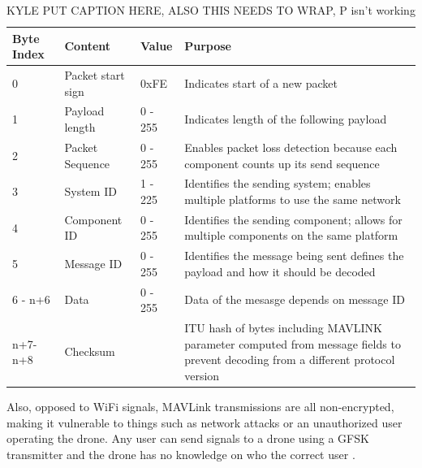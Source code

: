 \begin{table}[ht]
\centering
\caption{KYLE PUT CAPTION HERE, ALSO THIS NEEDS TO WRAP, P isn't working}
\begin{tabular}{|l|l|l|l|} %
  \hline
  Byte Index & Content & Value &  Purpose \\ \hline
          0 &	Packet start sign &                  0xFE &       Indicates start of a new packet\\
          1 &   Payload length &                0 - 255 &       Indicates length of the following payload \\
          2 &   Packet Sequence &               0 - 255 &       Enables packet loss detection because each component counts up its send sequence \\
          3 &   System ID &            1 - 225 &  Identifies the sending system; enables multiple platforms to use the same network \\
          4 &   Component ID &         0 - 255 &  Identifies the sending component; allows for multiple components on the same platform \\
          5 &	Message ID &		   0 - 255 &  Identifies the message being sent defines the payload and how it should be decoded \\
          6 - n+6 &	Data & 			   0 - 255 & Data of the mesasge depends on message ID \\
          n+7-n+8 & Checksum & & ITU hash of bytes including MAVLINK parameter computed from message fields to prevent decoding from a different protocol version \\ \hline
\end{tabular}\end{table}
\par
Also, opposed to WiFi signals, MAVLink transmissions are all non-encrypted, making it vulnerable to things such as network attacks or an unauthorized user operating the drone. Any user can send signals to a drone using a GFSK transmitter and the drone has no knowledge on who the correct user \cite{mavlink_vuln}.

